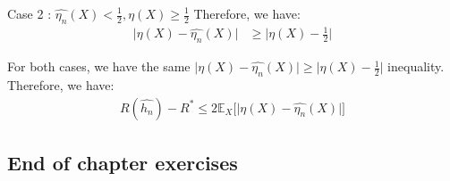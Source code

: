 \begin{proof*}
\begin{subproof}{\newline Case 2 : $\widehat{\eta_n}(X) < \frac{1}{2}, \eta(X) \ge \frac{1}{2}$}
        \noindent\newline Therefore, we have:
        \begin{align*}
            \Bigg| \eta(X) - \widehat{\eta_n}(X) \Bigg| &\ge \Bigg| \eta(X) - \frac{1}{2} \Bigg|
        \end{align*}
    \end{subproof}
    \noindent\newline For both cases, we have the same $\Big| \eta(X) - \widehat{\eta_n}(X) \Big| \ge \Big| \eta(X) - \frac{1}{2} \Big|$ inequality. Therefore, we have:
    \begin{align*}
         R(\widehat{h_n}) - R^* \le 2 \mathbb{E}_X\Big[ \Big| \eta(X) - \widehat{\eta_n}(X) \Big| \Big]
    \end{align*}
\end{proof*}

\newpage
\subsection{End of chapter exercises}


